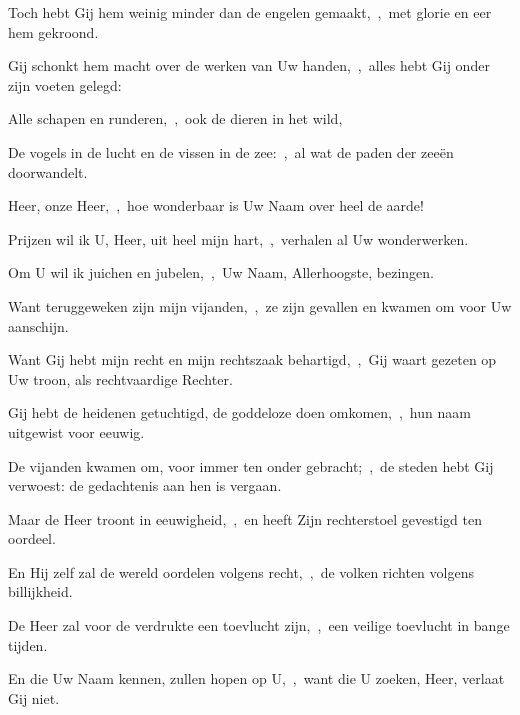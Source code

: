 \documentclass[12pt,twoside,a5paper]{article}
\begin{document}
\begin{halfparskip}
  Toch hebt Gij hem weinig minder dan de engelen gemaakt,~\sep\ met glorie en eer hem gekroond.

  Gij schonkt hem macht over de werken van Uw handen,~\sep\ alles hebt Gij onder zijn voeten gelegd:

  Alle schapen en runderen,~\sep\ ook de dieren in het wild,

  De vogels in de lucht en de vissen in de zee:~\sep\ al wat de paden der zeeën doorwandelt.

  Heer, onze Heer,~\sep\ hoe wonderbaar is Uw Naam over heel de aarde!
\end{halfparskip}



\begin{halfparskip}
  Prijzen wil ik U, Heer, uit heel mijn hart,~\sep\ verhalen al Uw wonderwerken.


  Om U wil ik juichen en jubelen,~\sep\ Uw Naam, Allerhoogste, bezingen.

  Want teruggeweken zijn mijn vijanden,~\sep\ ze zijn gevallen en kwamen om voor Uw aanschijn.

  Want Gij hebt mijn recht en mijn rechtszaak behartigd,~\sep\ Gij waart gezeten op Uw troon, als rechtvaardige Rechter.

  Gij hebt de heidenen getuchtigd, de goddeloze doen omkomen,~\sep\ hun naam uitgewist voor eeuwig.

  De vijanden kwamen om, voor immer ten onder gebracht;~\sep\ de steden hebt Gij verwoest: de gedachtenis aan hen is vergaan.

  Maar de Heer troont in eeuwigheid,~\sep\ en heeft Zijn rechterstoel gevestigd ten oordeel.

  En Hij zelf zal de wereld oordelen volgens recht,~\sep\ de volken richten volgens billijkheid.

  De Heer zal voor de verdrukte een toevlucht zijn,~\sep\ een veilige toevlucht in bange tijden.

  En die Uw Naam kennen, zullen hopen op U,~\sep\ want die U zoeken, Heer, verlaat Gij niet.
\end{halfparskip}

\end{document}
